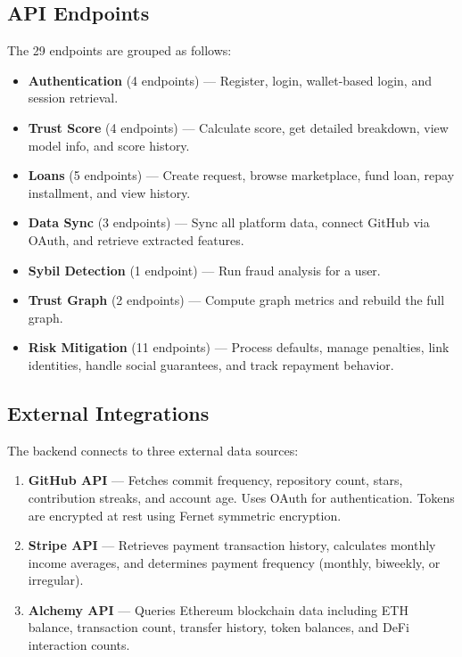 \documentclass[12pt, a4paper]{article}
\begin{document}
\subsection{API Endpoints}

The 29 endpoints are grouped as follows:

\begin{itemize}[nosep]
    \item \textbf{Authentication} (4 endpoints) --- Register, login, wallet-based login, and session retrieval.
    \item \textbf{Trust Score} (4 endpoints) --- Calculate score, get detailed breakdown, view model info, and score history.
    \item \textbf{Loans} (5 endpoints) --- Create request, browse marketplace, fund loan, repay installment, and view history.
    \item \textbf{Data Sync} (3 endpoints) --- Sync all platform data, connect GitHub via OAuth, and retrieve extracted features.
    \item \textbf{Sybil Detection} (1 endpoint) --- Run fraud analysis for a user.
    \item \textbf{Trust Graph} (2 endpoints) --- Compute graph metrics and rebuild the full graph.
    \item \textbf{Risk Mitigation} (11 endpoints) --- Process defaults, manage penalties, link identities, handle social guarantees, and track repayment behavior.
\end{itemize}

\subsection{External Integrations}

The backend connects to three external data sources:

\begin{enumerate}[nosep]
    \item \textbf{GitHub API} --- Fetches commit frequency, repository count, stars, contribution streaks, and account age. Uses OAuth for authentication. Tokens are encrypted at rest using Fernet symmetric encryption.
    \item \textbf{Stripe API} --- Retrieves payment transaction history, calculates monthly income averages, and determines payment frequency (monthly, biweekly, or irregular).
    \item \textbf{Alchemy API} --- Queries Ethereum blockchain data including ETH balance, transaction count, transfer history, token balances, and DeFi interaction counts.
\end{enumerate}
\end{document}
